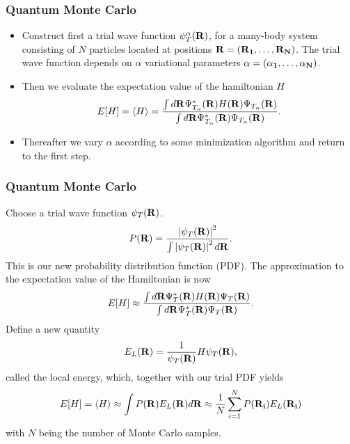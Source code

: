 \documentclass[compress]{beamer}
\begin{document}
\frame
{
  \frametitle{Quantum Monte Carlo}
\begin{small}
{\scriptsize
\begin{itemize}
\item Construct first a trial wave function $\psi_T^{\alpha}({\bf R})$, 
for a many-body
system consisting of $N$ particles located at positions
${\bf R=(R_1,\dots ,R_N)}$. The trial wave function depends
on $\alpha$ variational parameters ${\bf \alpha=(\alpha_1,\dots ,\alpha_N)}$.
\item Then we evaluate the expectation value of the hamiltonian $H$ 
\[
   E[H]=\langle H \rangle =
   \frac{\int d{\bf R}\Psi^{\ast}_{T_{\alpha}}({\bf R})H({\bf R})
         \Psi_{T_{\alpha}}({\bf R})}
        {\int d{\bf R}\Psi^{\ast}_{T_{\alpha}}({\bf R})\Psi_{T_{\alpha}}({\bf R})}.
\]
\item Thereafter we vary $\alpha$ according to some minimization
algorithm and return to the first step.
\end{itemize}
}
\end{small}
}


\frame
{
  \frametitle{Quantum Monte Carlo}
\begin{small}
{\scriptsize
Choose a trial wave function
$\psi_T({\bf R})$.
\[
   P({\bf R})= \frac{\left|\psi_T({\bf R})\right|^2}{\int \left|\psi_T({\bf R})\right|^2d{\bf R}}.
\]
This is our new probability distribution function  (PDF).
The approximation to the expectation value of the Hamiltonian is now 
\[
   E[H]\approx 
   \frac{\int d{\bf R}\Psi^{\ast}_T({\bf R})H({\bf R})\Psi_T({\bf R})}
        {\int d{\bf R}\Psi^{\ast}_T({\bf R})\Psi_T({\bf R})}.
\]
Define a new quantity
\[
   E_L({\bf R})=\frac{1}{\psi_T({\bf R})}H\psi_T({\bf R}),
   \label{eq:locale1}
\]
called the local energy, which, together with our trial PDF yields
\[
  E[H]=\langle H \rangle \approx \int P({\bf R})E_L({\bf R}) d{\bf R}\approx \frac{1}{N}\sum_{i=1}^NP({\bf R_i})E_L({\bf R_i})
  \label{eq:vmc1}
\]
with $N$ being the number of Monte Carlo samples.
}
\end{small}
}
\end{document}
